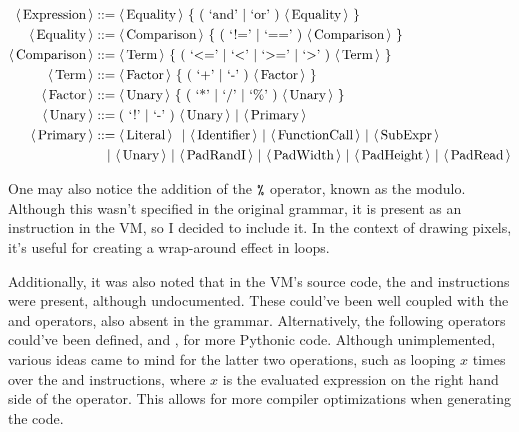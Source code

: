 \begin{align*}
        \langle\, \text{Expression}\, \rangle & ::= \langle\, \text{Equality}\, \rangle \ \{ \ ( \ \text{`and'} \ |\  \text{`or'} \ )\ \langle\, \text{Equality}\, \rangle \ \}                                 \\
        \langle\, \text{Equality}\, \rangle   & ::= \langle\, \text{Comparison}\, \rangle \ \{ \ ( \ \text{`!='} \ |\  \text{`=='} \ )\  \langle\, \text{Comparison}\, \rangle \ \}                             \\
        \langle\, \text{Comparison}\, \rangle & ::= \langle\, \text{Term}\, \rangle \ \{ \ ( \ \text{`<='} \ |\  \text{`<'} \ |\  \text{`>='} \ |\  \text{`>'} \ )\  \langle\, \text{Term}\, \rangle  \ \}      \\
        \langle\, \text{Term}\, \rangle       & ::= \langle\, \text{Factor}\, \rangle \ \{ \ ( \ \text{`+'} \ |\  \text{`-'} \ )\ \langle\, \text{Factor}\, \rangle \ \}                                        \\
        \langle\, \text{Factor}\, \rangle     & ::= \langle\, \text{Unary}\, \rangle \ \{ \ ( \ \text{`*'} \ |\  \text{`/'} \ |\ \text{`\%'} \ )\ \langle\, \text{Unary}\, \rangle \ \}                         \\
        \langle\, \text{Unary}\, \rangle      & ::=  ( \ \text{`!'} \ |\  \text{`-'} \ ) \ \langle\, \text{Unary}\, \rangle \ |\ \langle\, \text{Primary}\, \rangle                                             \\
        \langle\, \text{Primary}\, \rangle    & ::= \langle\, \text{Literal}\, \rangle \ \ |\
        \langle\, \text{Identifier}\, \rangle \ |\ \langle\, \text{FunctionCall}\, \rangle \ |\ \langle\, \text{SubExpr}\, \rangle
        \                                                                                                                                                    \\
                             & \quad | \ \langle\, \text{Unary}\, \rangle \ | \ \langle\, \text{PadRandI}\, \rangle \ | \ \langle\, \text{PadWidth}\, \rangle \ | \ \langle\, \text{PadHeight}\, \rangle \ | \ \langle\, \text{PadRead}\, \rangle
\end{align*}

One may also notice the addition of the $\texttt{\%}$ operator, known as the
modulo.  Although this wasn't specified in the original grammar, it is present
as an instruction in the VM, so I decided to include it. In the context of
drawing pixels, it's useful for creating a wrap-around effect in loops.

Additionally, it was also noted that in the VM's source code, the  and
\code{dec} instructions were present, although undocumented. These could've been
well coupled with the \code{++} and \code{--} operators, also absent in the
grammar. Alternatively, the following operators could've been defined, \code{+=}
and \code{-=}, for more Pythonic code. Although unimplemented, various
ideas came to mind for the latter two operations, such as looping $x$ times over
the \code{inc} and \code{dec} instructions, where $x$ is the evaluated
expression on the right hand side of the operator. This allows for more compiler
optimizations when generating the \code{ParIR} code.
